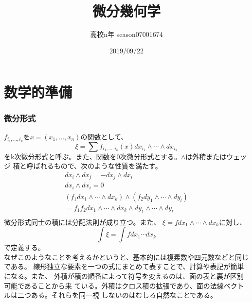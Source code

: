 \documentclass{jsarticle}
\begin{document}
\title{微分幾何学}
\author{高校n年 season07001674}
\date{2019/09/22}
\maketitle
\tableofcontents

\newcommand{\repart}[1]{\part{#1}\setcounter{section}{0}}
\newcommand{\lr}[1]{\left(#1 \right)}
\newcommand{\mlr}[1]{\left\{#1 \right\}}
\newcommand{\llr}[1]{\left[#1 \right]}
\newcommand{\rec}[1]{\frac{1}{#1}}
\newcommand{\di}[2][]{\frac{d #1}{d #2}}
\newcommand{\dd}[2][]{\frac{d^2 #1}{d #2^2}}
\newcommand{\pd}[2][]{\frac{\partial #1}{\partial #2}}
\newcommand{\ppd}[3]{\frac{\partial^2 #1}{\partial #2\partial #3}}
\newcommand{\pmat}[1]{\begin{pmatrix} #1 \end{pmatrix}}
\newcommand{\we}{\wedge}
\newcommand{\gr}{\theta}
\newcommand{\om}{\omega}
\newcommand{\pa}{\partial}
\newcommand{\na}{\nabla}
\newcommand{\Ga}{\Gamma}
\newcommand{\chr}[2]{\left\{#1 \atop #2\right\}}


\repart{数学的準備}
    \section{微分形式}
        $f_{i_1,\ldots,i_k}$を$x=(x_1,\ldots,x_n)$の関数として、
            \[\xi = \sum f_{i_1,\ldots,i_k}(x)dx_{i_1}
            \we\cdots\we dx_{i_k}\]
        をk次微分形式と呼ぶ。また、関数を0次微分形式とする。$\we$は外積またはウェッジ
        積と呼ばれるもので、次のような性質を満たす。
        \begin{gather*}
            dx_i\we dx_j = -dx_j\we dx_i \tag{交代性}\\
            dx_i\we dx_i = 0\\
            (f_1dx_1\we\cdots\we dx_k)\we(f_2dy_1\we\cdots\we dy_l)\\
            = f_1f_2dx_1\we\cdots\we dx_k\we dy_1\we\cdots\we dy_l\\
        \end{gather*}
        微分形式同士の積には分配法則が成り立つ。また、
        $\xi = fdx_1\we\cdots\we dx_k$に対し、
            \[\int \xi = \int fdx_1\cdots dx_k\]
        で定義する。\\
        なぜこのようなことを考えるかというと、基本的には複素数や四元数などと同じである。
        線形独立な要素を一つの式にまとめて表すことで、計算や表記が簡単になる。また、
        外積が積の順番によって符号を変えるのは、面の表と裏が区別可能であることから来
        ている。外積はクロス積の拡張であり、面の法線ベクトルは二つある。それらを同一視
        しないのはむしろ自然なことである。\\
\end{document}
